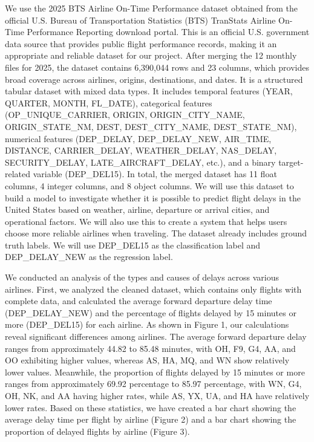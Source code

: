 We use the 2025 BTS Airline On-Time Performance dataset obtained from the official U.S. Bureau of Transportation Statistics (BTS) TranStats Airline On-Time Performance Reporting download portal. This is an official U.S. government data source that provides public flight performance records, making it an appropriate and reliable dataset for our project. After merging the 12 monthly files for 2025, the dataset contains 6,390,044 rows and 23 columns, which provides broad coverage across airlines, origins, destinations, and dates. It is a structured tabular dataset with mixed data types. It includes temporal features (YEAR, QUARTER, MONTH, FL\_DATE), categorical features (OP\_UNIQUE\_CARRIER, ORIGIN, ORIGIN\_CITY\_NAME, ORIGIN\_STATE\_NM, DEST, DEST\_CITY\_NAME, DEST\_STATE\_NM), numerical features (DEP\_DELAY, DEP\_DELAY\_NEW, AIR\_TIME, DISTANCE, CARRIER\_DELAY, WEATHER\_DELAY, NAS\_DELAY, SECURITY\_DELAY, LATE\_AIRCRAFT\_DELAY, etc.), and a binary target-related variable (DEP\_DEL15). In total, the merged dataset has 11 float columns, 4 integer columns, and 8 object columns. We will use this dataset to build a model to investigate whether it is possible to predict flight delays in the United States based on weather, airline, departure or arrival cities, and operational factors. We will also use this to create a system that helps users choose more reliable airlines when traveling. The dataset already includes ground truth labels. We will use DEP\_DEL15 as the classification label and DEP\_DELAY\_NEW as the regression label.

We conducted an analysis of the types and causes of delays across various airlines. First, we analyzed the cleaned dataset, which contains only flights with complete data, and calculated the average forward departure delay time (DEP\_DELAY\_NEW) and the percentage of flights delayed by 15 minutes or more (DEP\_DEL15) for each airline. As shown in Figure 1, our calculations reveal significant differences among airlines. The average forward departure delay ranges from approximately 44.82 to 85.48 minutes, with OH, F9, G4, AA, and OO exhibiting higher values, whereas AS, HA, MQ, and WN show relatively lower values. Meanwhile, the proportion of flights delayed by 15 minutes or more ranges from approximately 69.92 percentage to 85.97 percentage, with WN, G4, OH, NK, and AA having higher rates, while AS, YX, UA, and HA have relatively lower rates. Based on these statistics, we have created a bar chart showing the average delay time per flight by airline (Figure 2) and a bar chart showing the proportion of delayed flights by airline (Figure 3).

